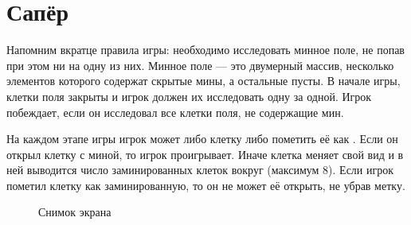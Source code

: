 \section{Сапёр}
\label{sec:minesweeper}

Напомним вкратце правила игры: необходимо исследовать минное поле, не попав при 
этом ни на одну из них. Минное поле --- это двумерный массив, несколько 
элементов которого содержат скрытые мины, а остальные пусты. В начале игры, 
клетки поля закрыты и игрок должен их исследовать одну за одной. Игрок 
побеждает, если он исследовал все клетки поля, не содержащие мин.

На каждом этапе игры игрок может либо  клетку либо пометить её как 
. Если он открыл клетку с миной, то игрок проигрывает. 
Иначе клетка меняет свой вид и в ней выводится число заминированных клеток 
вокруг (максимум 8). Если игрок пометил клетку как заминированную, то он не 
может её открыть, не убрав метку.

\begin{figure}[hbt]
	\caption{\label{fig:screenshot}Снимок экрана}
\end{figure}

